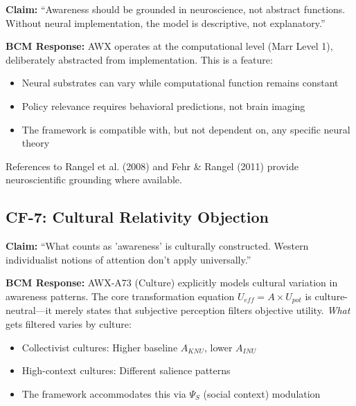 \begin{tcolorbox}[colback=red!5!white, colframe=red!75!black, title=Objection]
\textbf{Claim:} ``Awareness should be grounded in neuroscience, not abstract functions. Without neural implementation, the model is descriptive, not explanatory.''
\end{tcolorbox}

\textbf{BCM Response:} AWX operates at the computational level (Marr Level 1), deliberately abstracted from implementation. This is a feature:
\begin{itemize}[nosep]
    \item Neural substrates can vary while computational function remains constant
    \item Policy relevance requires behavioral predictions, not brain imaging
    \item The framework is compatible with, but not dependent on, any specific neural theory
\end{itemize}
References to Rangel et al. (2008) and Fehr \& Rangel (2011) provide neuroscientific grounding where available.

\subsection{CF-7: Cultural Relativity Objection}

\begin{tcolorbox}[colback=red!5!white, colframe=red!75!black, title=Objection]
\textbf{Claim:} ``What counts as 'awareness' is culturally constructed. Western individualist notions of attention don't apply universally.''
\end{tcolorbox}

\textbf{BCM Response:} AWX-A73 (Culture) explicitly models cultural variation in awareness patterns. The core transformation equation $U_{eff} = A \times U_{pot}$ is culture-neutral---it merely states that subjective perception filters objective utility. \textit{What} gets filtered varies by culture:
\begin{itemize}[nosep]
    \item Collectivist cultures: Higher baseline $A_{KNU}$, lower $A_{INU}$
    \item High-context cultures: Different salience patterns
    \item The framework accommodates this via $\Psi_S$ (social context) modulation
\end{itemize}


